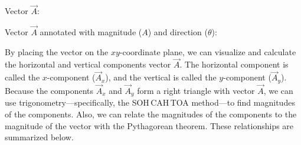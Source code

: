 \documentclass[dvipsnames]{article}
\begin{document}
\begin{center}
\begin{minipage}{0.3\textwidth}
\centering

Vector $\vec{A}$:

\bigskip

\end{minipage}%
\begin{minipage}{0.65\textwidth}
\centering

Vector $\vec{A}$ annotated with magnitude ($A$) and direction ($\theta$):

\bigskip

\end{minipage}
\end{center}

By placing the vector on the $xy$-coordinate plane, we can visualize and calculate the horizontal and vertical components vector $\vec{A}$. The horizontal component is called the $x$-component ($\vec{A}_x$), and the vertical is called the $y$-component ($\vec{A}_y$). Because the components $\vec{A}_x$ and $\vec{A}_y$ form a right triangle with vector $\vec{A}$, we can use trigonometry---specifically, the SOH\,CAH\,TOA method---to find magnitudes of the components. Also, we can relate the magnitudes of the components to the magnitude of the vector with the Pythagorean theorem. These relationships are summarized below.
\end{document}
